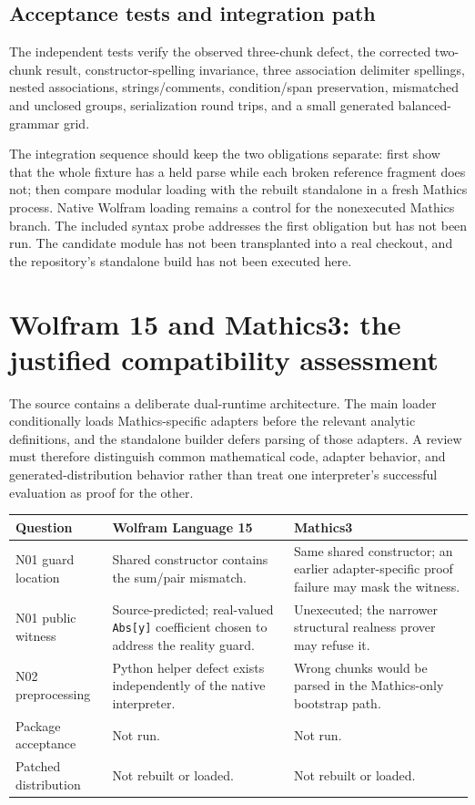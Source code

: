 \documentclass[11pt,letterpaper]{article}
\newcommand{\code}[1]{\nolinkurl{#1}}
\begin{document}
\subsection{Acceptance tests and integration path}
The independent tests verify the observed three-chunk defect, the corrected two-chunk result, constructor-spelling invariance, three association delimiter spellings, nested associations, strings/comments, condition/span preservation, mismatched and unclosed groups, serialization round trips, and a small generated balanced-grammar grid.

The integration sequence should keep the two obligations separate: first show that the whole fixture has a held parse while each broken reference fragment does not; then compare modular loading with the rebuilt standalone in a fresh Mathics process. Native Wolfram loading remains a control for the nonexecuted Mathics branch. The included syntax probe addresses the first obligation but has not been run. The candidate module has not been transplanted into a real checkout, and the repository's standalone build has not been executed here.

\section{Wolfram 15 and Mathics3: the justified compatibility assessment}
\label{sec:compatibility}

The source contains a deliberate dual-runtime architecture. The main loader conditionally loads Mathics-specific adapters before the relevant analytic definitions, and the standalone builder defers parsing of those adapters. A review must therefore distinguish common mathematical code, adapter behavior, and generated-distribution behavior rather than treat one interpreter's successful evaluation as proof for the other.\cite{entry,builder,mathicsassumptions,mathicsspecial}

\begin{tabularx}{\linewidth}{@{}lYY@{}}
\toprule
Question & Wolfram Language 15 & Mathics3\\
\midrule
N01 guard location & Shared constructor contains the sum/pair mismatch. & Same shared constructor; an earlier adapter-specific proof failure may mask the witness.\\
N01 public witness & Source-predicted; real-valued \code{Abs[y]} coefficient chosen to address the reality guard. & Unexecuted; the narrower structural realness prover may refuse it.\\
N02 preprocessing & Python helper defect exists independently of the native interpreter. & Wrong chunks would be parsed in the Mathics-only bootstrap path.\\
Package acceptance & Not run. & Not run.\\
Patched distribution & Not rebuilt or loaded. & Not rebuilt or loaded.\\
\bottomrule
\end{tabularx}
\end{document}
